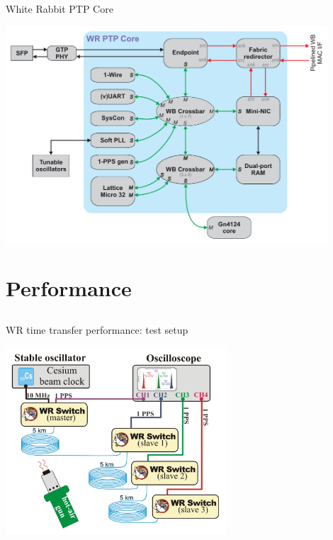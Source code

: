 \documentclass[compress, red]{beamer}
\begin{document}
\begin{frame}{White Rabbit PTP Core}
 \begin{center}
   \includegraphics[width=0.9\textwidth]{node/wrpc_inside.pdf}
   \end{center}
\end{frame}


\section{Performance}
\subsection{}
\begin{frame}{WR time transfer performance: test setup}

    \begin{center}
    \includegraphics[height=7.0cm]{measurements/meas_setup.pdf}
    \end{center}

\end{frame}
\end{document}
